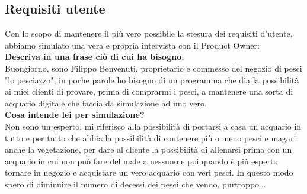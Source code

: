\documentclass[12pt,a4paper,oneside,article]{article}
\begin{document}
	\subsection{Requisiti utente}
	Con lo scopo di mantenere il più vero possibile la stesura dei requisiti d'utente, abbiamo simulato una vera e propria intervista con il Product Owner:\\
	
	{\large \textbf{Descriva in una frase ciò di cui ha bisogno.}}\\
	Buongiorno, sono Filippo Benvenuti, proprietario e commesso del negozio di pesci "lo pesciazzo", in poche parole ho bisogno di un programma che dia la possibilità ai miei clienti di provare, prima di comprarmi i pesci, a mantenere una sorta di acquario digitale che faccia da simulazione ad uno vero.
	\\
	
	{\large \textbf{Cosa intende lei per simulazione?}}\\
	Non sono un esperto, mi riferisco alla possibilità di portarsi a casa un acquario in tutto e per tutto che abbia la possibilità di contenere più o meno pesci e magari anche la vegetazione, per dare al cliente la possibilità di allenarsi prima con un acquario in cui non può fare del male a nessuno e poi quando è più esperto tornare in negozio e acquistare un vero acquario con veri pesci. In questo modo spero di diminuire il numero di decessi dei pesci che vendo, purtroppo...
	\\
	
\end{document}
